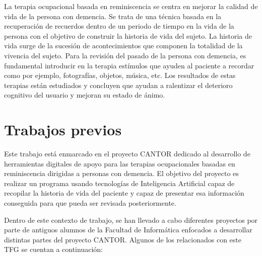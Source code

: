 La terapia ocupacional basada en reminiscencia se centra en mejorar la calidad de vida de la persona con demencia. Se trata de una técnica basada en la recuperación de recuerdos dentro de un periodo de tiempo en la vida de la persona con el objetivo de construir la historia de vida del sujeto. La historia de vida surge de la sucesión de acontecimientos que componen la totalidad de la vivencia del sujeto. Para la revisión del pasado de la persona con demencia, es fundamental introducir en la terapia estímulos que ayuden al paciente a recordar como por ejemplo, fotografías, objetos, música, etc. Los resultados de estas terapias están estudiados y concluyen que ayudan a ralentizar el deterioro cognitivo del usuario y mejoran su estado de ánimo.


\section{Trabajos previos}

Este trabajo está enmarcado en el proyecto CANTOR \citep{cantor} dedicado al desarrollo de herramientas digitales de apoyo para las terapias ocupacionales basadas en reminiscencia dirigidas a personas con demencia. El objetivo del proyecto es realizar un programa usando tecnologías de Inteligencia Artificial capaz de recopilar la historia de vida del paciente y capaz de presentar esa información conseguida para que pueda ser revisada posteriormente. 

Dentro de este contexto de trabajo, se han llevado a cabo diferentes proyectos por parte de antiguos alumnos de la Facultad de Informática enfocados a desarrollar distintas partes del proyecto CANTOR. Algunos de los relacionados con este TFG se cuentan a continuación: 

